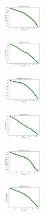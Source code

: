 \begin{figure}[H]
\begin{subfigure}
        \centering
        \includegraphics[width=0.234\textwidth]{img/bl/ecoli_set_const_20_589741062_cost.png}
    \end{subfigure}
    \hfill
    \begin{subfigure}
        \centering
        \includegraphics[width=0.234\textwidth]{img/bl/rand_set_const_20_589741062_cost.png}
    \end{subfigure}
    \hfill
    \begin{subfigure}
        \centering
        \includegraphics[width=0.234\textwidth]{img/bl/newthyroid_set_const_20_589741062_cost.png}
    \end{subfigure}
    \hfill
    \begin{subfigure}
        \centering
        \includegraphics[width=0.234\textwidth]{img/bl/iris_set_const_20_277451237_cost.png}
    \end{subfigure}
    \hfill
    \begin{subfigure}
        \centering
        \includegraphics[width=0.234\textwidth]{img/bl/ecoli_set_const_20_277451237_cost.png}
    \end{subfigure}
    \hfill
    \begin{subfigure}
        \centering
        \includegraphics[width=0.234\textwidth]{img/bl/rand_set_const_20_277451237_cost.png}

\end{subfigure}
\end{figure}

